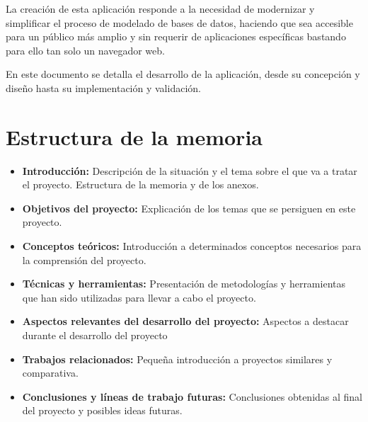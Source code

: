 La creación de esta aplicación responde a la necesidad de modernizar y simplificar el proceso de modelado de bases de datos, haciendo que sea accesible para un público más amplio y sin requerir de aplicaciones específicas bastando para ello tan solo un navegador web.

En este documento se detalla el desarrollo de la aplicación, desde su concepción y diseño hasta su implementación y validación.

\section{Estructura de la memoria}
\begin{itemize}
\tightlist
    \item
        \textbf{Introducción: }Descripción de la situación y el tema sobre el que va a tratar el proyecto. Estructura de la memoria y de los anexos.
    \item 
        \textbf{Objetivos del proyecto: }Explicación de los temas que se persiguen en este proyecto.
    \item 
        \textbf{Conceptos teóricos: }Introducción a determinados conceptos necesarios para la comprensión del proyecto.
    \item 
        \textbf{Técnicas y herramientas: }Presentación de metodologías y herramientas que han sido utilizadas para llevar a cabo el proyecto. 
    \item 
        \textbf{Aspectos relevantes del desarrollo del proyecto: }Aspectos a destacar durante el desarrollo del proyecto
    \item 
        \textbf{Trabajos relacionados: } Pequeña introducción a proyectos similares y comparativa.
    \item 
        \textbf{Conclusiones y líneas de trabajo futuras: }Conclusiones obtenidas al final del proyecto y posibles ideas futuras.
\end{itemize}

